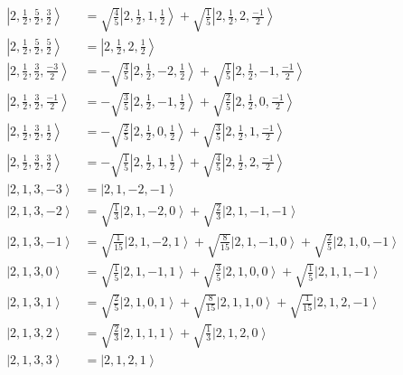 \documentclass{report}
\newcommand{\ket}[1]{\left| #1 \right>} %
\begin{document}
\begin{align*}
\ket{ 2 ,  \frac{1}{2} ,  \frac{5}{2} ,  \frac{3}{2}  } &=  \sqrt{  \frac{4}{5}  } \ket{ 2 ,  \frac{1}{2} ,  1 ,  \frac{1}{2}  } + \sqrt{  \frac{1}{5}  } \ket{ 2 ,  \frac{1}{2} ,  2 ,  \frac{-1}{2}  } \\
\ket{ 2 ,  \frac{1}{2} ,  \frac{5}{2} ,  \frac{5}{2}  } &=  \ket{ 2 ,  \frac{1}{2} ,  2 ,  \frac{1}{2}  } \\
\ket{ 2 ,  \frac{1}{2} ,  \frac{3}{2} ,  \frac{-3}{2}  } &=  - \sqrt{  \frac{4}{5}  } \ket{ 2 ,  \frac{1}{2} ,  -2 ,  \frac{1}{2}  } + \sqrt{  \frac{1}{5}  } \ket{ 2 ,  \frac{1}{2} ,  -1 ,  \frac{-1}{2}  } \\
\ket{ 2 ,  \frac{1}{2} ,  \frac{3}{2} ,  \frac{-1}{2}  } &=  - \sqrt{  \frac{3}{5}  } \ket{ 2 ,  \frac{1}{2} ,  -1 ,  \frac{1}{2}  } + \sqrt{  \frac{2}{5}  } \ket{ 2 ,  \frac{1}{2} ,  0 ,  \frac{-1}{2}  } \\
\ket{ 2 ,  \frac{1}{2} ,  \frac{3}{2} ,  \frac{1}{2}  } &=  - \sqrt{  \frac{2}{5}  } \ket{ 2 ,  \frac{1}{2} ,  0 ,  \frac{1}{2}  } + \sqrt{  \frac{3}{5}  } \ket{ 2 ,  \frac{1}{2} ,  1 ,  \frac{-1}{2}  } \\
\ket{ 2 ,  \frac{1}{2} ,  \frac{3}{2} ,  \frac{3}{2}  } &=  - \sqrt{  \frac{1}{5}  } \ket{ 2 ,  \frac{1}{2} ,  1 ,  \frac{1}{2}  } + \sqrt{  \frac{4}{5}  } \ket{ 2 ,  \frac{1}{2} ,  2 ,  \frac{-1}{2}  } \\
\ket{ 2 ,  1 ,  3 ,  -3  } &=  \ket{ 2 ,  1 ,  -2 ,  -1  } \\
\ket{ 2 ,  1 ,  3 ,  -2  } &=  \sqrt{  \frac{1}{3}  } \ket{ 2 ,  1 ,  -2 ,  0  } + \sqrt{  \frac{2}{3}  } \ket{ 2 ,  1 ,  -1 ,  -1  } \\
\ket{ 2 ,  1 ,  3 ,  -1  } &=  \sqrt{  \frac{1}{15}  } \ket{ 2 ,  1 ,  -2 ,  1  } + \sqrt{  \frac{8}{15}  } \ket{ 2 ,  1 ,  -1 ,  0  } + \sqrt{  \frac{2}{5}  } \ket{ 2 ,  1 ,  0 ,  -1  } \\
\ket{ 2 ,  1 ,  3 ,  0  } &=  \sqrt{  \frac{1}{5}  } \ket{ 2 ,  1 ,  -1 ,  1  } + \sqrt{  \frac{3}{5}  } \ket{ 2 ,  1 ,  0 ,  0  } + \sqrt{  \frac{1}{5}  } \ket{ 2 ,  1 ,  1 ,  -1  } \\
\ket{ 2 ,  1 ,  3 ,  1  } &=  \sqrt{  \frac{2}{5}  } \ket{ 2 ,  1 ,  0 ,  1  } + \sqrt{  \frac{8}{15}  } \ket{ 2 ,  1 ,  1 ,  0  } + \sqrt{  \frac{1}{15}  } \ket{ 2 ,  1 ,  2 ,  -1  } \\
\ket{ 2 ,  1 ,  3 ,  2  } &=  \sqrt{  \frac{2}{3}  } \ket{ 2 ,  1 ,  1 ,  1  } + \sqrt{  \frac{1}{3}  } \ket{ 2 ,  1 ,  2 ,  0  } \\
\ket{ 2 ,  1 ,  3 ,  3  } &=  \ket{ 2 ,  1 ,  2 ,  1  } \\

\end{align*}
\end{document}
